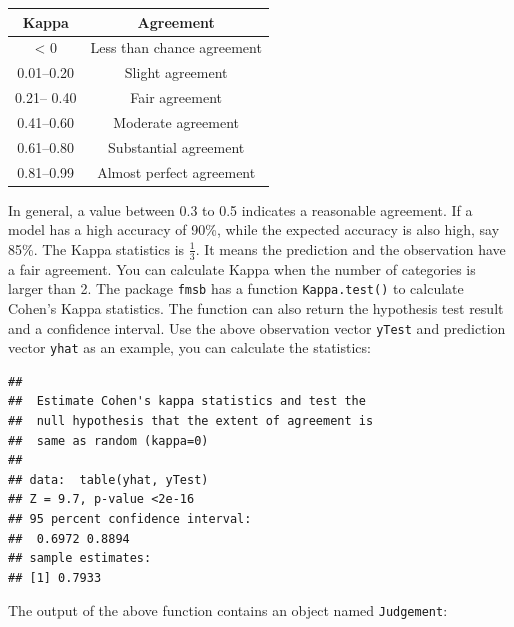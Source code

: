 \documentclass[
  12pt,
]{krantz}
\makeatletter
\newenvironment{Shaded}{\begin{snugshade}}{\end{snugshade}}
\newcommand{\CommentTok}[1]{\textcolor[rgb]{0.37,0.37,0.37}{\textit{#1}}}
\newcommand{\FunctionTok}[1]{\textcolor[rgb]{0,0,0}{#1}}
\newcommand{\NormalTok}[1]{#1}
\newcommand{\OtherTok}[1]{\textcolor[rgb]{0.37,0.37,0.37}{#1}}
\newcommand{\SpecialCharTok}[1]{\textcolor[rgb]{0,0,0}{#1}}
\newenvironment{kframe}{%
\medskip{}
\setlength{\fboxsep}{.8em}
 \def\at@end@of@kframe{}%
 \ifinner\ifhmode%
  \def\at@end@of@kframe{\end{minipage}}%
  \begin{minipage}{\columnwidth}%
 \fi\fi%
 \def\FrameCommand##1{\hskip\@totalleftmargin \hskip-\fboxsep
 \colorbox{shadecolor}{##1}\hskip-\fboxsep
     \hskip-\linewidth \hskip-\@totalleftmargin \hskip\columnwidth}%
 \MakeFramed {\advance\hsize-\width
   \@totalleftmargin\z@ \linewidth\hsize
   \@setminipage}}%
 {\par\unskip\endMakeFramed%
 \at@end@of@kframe}
\renewenvironment{Shaded}{\begin{kframe}}{\end{kframe}}
\makeatother
\begin{document}
\begin{longtable}[]{@{}cc@{}}
\toprule()
Kappa & Agreement \\
\midrule()
\endhead
\textless{} 0 & Less than chance agreement \\
0.01--0.20 & Slight agreement \\
0.21-- 0.40 & Fair agreement \\
0.41--0.60 & Moderate agreement \\
0.61--0.80 & Substantial agreement \\
0.81--0.99 & Almost perfect agreement \\
\bottomrule()
\end{longtable}

In general, a value between 0.3 to 0.5 indicates a reasonable agreement. If a model has a high accuracy of 90\%, while the expected accuracy is also high, say 85\%. The Kappa statistics is \(\frac{1}{3}\). It means the prediction and the observation have a fair agreement. You can calculate Kappa when the number of categories is larger than 2. The package \texttt{fmsb} has a function \texttt{Kappa.test()} to calculate Cohen's Kappa statistics. The function can also return the hypothesis test result and a confidence interval. Use the above observation vector \texttt{yTest} and prediction vector \texttt{yhat} as an example, you can calculate the statistics:

\begin{Shaded}
\end{Shaded}

\begin{verbatim}
## 
##  Estimate Cohen's kappa statistics and test the
##  null hypothesis that the extent of agreement is
##  same as random (kappa=0)
## 
## data:  table(yhat, yTest)
## Z = 9.7, p-value <2e-16
## 95 percent confidence interval:
##  0.6972 0.8894
## sample estimates:
## [1] 0.7933
\end{verbatim}

The output of the above function contains an object named \texttt{Judgement}:

\begin{Shaded}
\end{Shaded}
\end{document}
